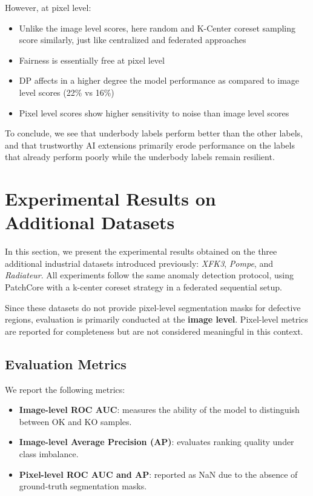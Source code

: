 \documentclass{article}
\begin{document}
However, at pixel level:
\begin{itemize}
	\item Unlike the image level scores, here random and K-Center coreset sampling score similarly, just like centralized and federated approaches
	\item Fairness is essentially free at pixel level
	\item DP affects in a higher degree the model performance as compared to image level scores (22\% vs 16\%)
	\item Pixel level scores show higher sensitivity to noise than image level scores
\end{itemize}

To conclude, we see that underbody labels perform better than the other labels, and that trustworthy AI extensions primarily erode performance on the labels that already perform poorly while the underbody labels remain resilient.

\section{Experimental Results on Additional Datasets}

In this section, we present the experimental results obtained on the three additional industrial datasets introduced previously: \textit{XFK3}, \textit{Pompe}, and \textit{Radiateur}.
All experiments follow the same anomaly detection protocol, using PatchCore with a k-center coreset strategy in a federated sequential setup.

Since these datasets do not provide pixel-level segmentation masks for defective regions, evaluation is primarily conducted at the \textbf{image level}. Pixel-level metrics are reported for completeness but are not considered meaningful in this context.

\subsection{Evaluation Metrics}

We report the following metrics:
\begin{itemize}
    \item \textbf{Image-level ROC AUC}: measures the ability of the model to distinguish between OK and KO samples.
    \item \textbf{Image-level Average Precision (AP)}: evaluates ranking quality under class imbalance.
    \item \textbf{Pixel-level ROC AUC and AP}: reported as NaN due to the absence of ground-truth segmentation masks.
\end{itemize}
\end{document}
